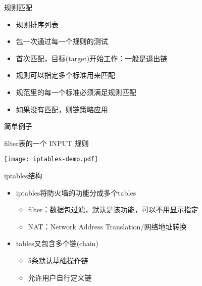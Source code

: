 \begin{frame}{规则匹配}
\begin{itemize}
\item 规则排序列表
\item 包一次通过每一个规则的测试
\item 首次匹配，目标(target)开始工作：一般是退出链
\item 规则可以指定多个标准用来匹配
\item 规范里的每一个标准必须满足规则匹配
\item 如果没有匹配，则链策略应用
\end{itemize}

\end{frame} 
 \begin{frame}{简单例子}

filter表的一个 INPUT 规则

\medskip{}


\texttt{[image: iptables-demo.pdf]}


\end{frame} 
 \begin{frame}{iptables结构}
\begin{itemize}
\item iptables将防火墙的功能分成多个tables

\begin{itemize}
\item filter：数据包过滤，\alert{默认是该功能，可以不用显示指定}
\item NAT：Network Address Translation/网络地址转换
\end{itemize}
\item tables又包含多个链(chain)

\begin{itemize}
\item 5条默认基础操作链
\item 允许用户自行定义链
\end{itemize}
\end{itemize}

\end{frame} 
